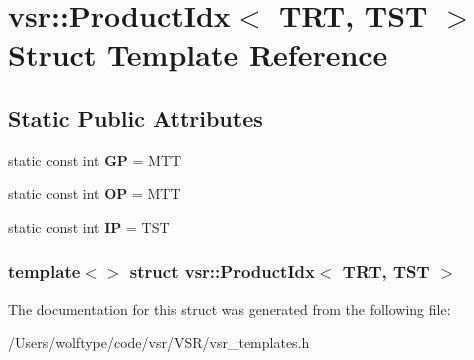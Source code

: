 \hypertarget{structvsr_1_1_product_idx_3_01_t_r_t_00_01_t_s_t_01_4}{\section{vsr\-:\-:Product\-Idx$<$ T\-R\-T, T\-S\-T $>$ Struct Template Reference}
\label{structvsr_1_1_product_idx_3_01_t_r_t_00_01_t_s_t_01_4}
}
\subsection*{Static Public Attributes}
\begin{DoxyCompactItemize}
\item 
\hypertarget{structvsr_1_1_product_idx_3_01_t_r_t_00_01_t_s_t_01_4_a31109458baac27a86f1c9068b41ecb66}{static const int {\bfseries G\-P} = M\-T\-T}\label{structvsr_1_1_product_idx_3_01_t_r_t_00_01_t_s_t_01_4_a31109458baac27a86f1c9068b41ecb66}

\item 
\hypertarget{structvsr_1_1_product_idx_3_01_t_r_t_00_01_t_s_t_01_4_a367cf4be80684c1252843d39adaeb08c}{static const int {\bfseries O\-P} = M\-T\-T}\label{structvsr_1_1_product_idx_3_01_t_r_t_00_01_t_s_t_01_4_a367cf4be80684c1252843d39adaeb08c}

\item 
\hypertarget{structvsr_1_1_product_idx_3_01_t_r_t_00_01_t_s_t_01_4_ae82d275646be843fbc777863f07a2f17}{static const int {\bfseries I\-P} = T\-S\-T}\label{structvsr_1_1_product_idx_3_01_t_r_t_00_01_t_s_t_01_4_ae82d275646be843fbc777863f07a2f17}

\end{DoxyCompactItemize}
\subsubsection*{template$<$$>$ struct vsr\-::\-Product\-Idx$<$ T\-R\-T, T\-S\-T $>$}



The documentation for this struct was generated from the following file\-:\begin{DoxyCompactItemize}
\item 
/\-Users/wolftype/code/vsr/\-V\-S\-R/vsr\-\_\-templates.\-h\end{DoxyCompactItemize}
